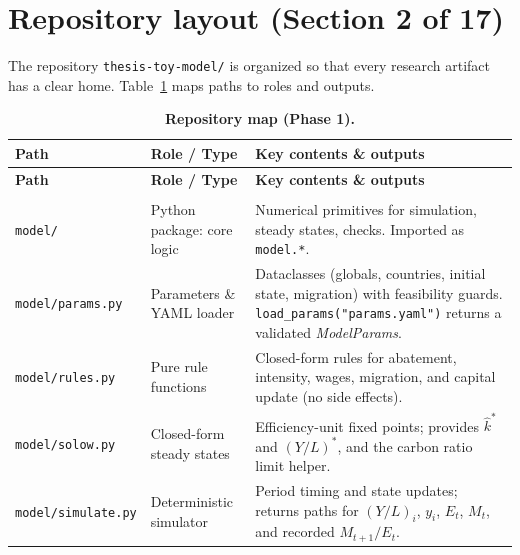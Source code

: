 \documentclass[12pt,a4paper]{article}
\newcommand{\code}[1]{\texttt{#1}}
\begin{document}
\section{Repository layout (Section 2 of 17)}
The repository \code{thesis-toy-model/} is organized so that every research artifact has a clear home. Table~\ref{tab:repo} maps paths to roles and outputs.

\begin{small}
\begin{longtable}{@{} >{\raggedright\arraybackslash}p{}
                         >{\raggedright\arraybackslash}p{}
                         >{\raggedright\arraybackslash}p{} @{}}
\caption{\textbf{Repository map (Phase 1).}} \label{tab:repo}\\
\toprule
\textbf{Path} & \textbf{Role / Type} & \textbf{Key contents \& outputs}\\
\midrule
\endfirsthead
\toprule
\textbf{Path} & \textbf{Role / Type} & \textbf{Key contents \& outputs}\\
\midrule
\endhead
\midrule
\multicolumn{3}{r}{\emph{continued on next page}}\\
\bottomrule
\endfoot
\bottomrule
\endlastfoot

\nolinkurl{model/} &
Python package: core logic &
Numerical primitives for simulation, steady states, checks. Imported as \nolinkurl{model.*}. \\[2pt]

\nolinkurl{model/params.py} &
Parameters \& YAML loader &
Dataclasses (globals, countries, initial state, migration) with feasibility guards. \nolinkurl{load_params("params.yaml")} returns a validated \emph{ModelParams}. \\[2pt]

\nolinkurl{model/rules.py} &
Pure rule functions &
Closed-form rules for abatement, intensity, wages, migration, and capital update (no side effects). \\[2pt]

\nolinkurl{model/solow.py} &
Closed-form steady states &
Efficiency-unit fixed points; provides \(\hat{k}^\ast\) and \((Y/L)^\ast\), and the carbon ratio limit helper. \\[2pt]

\nolinkurl{model/simulate.py} &
Deterministic simulator &
Period timing and state updates; returns paths for \((Y/L)_i\), \(y_i\), \(E_t\), \(M_t\), and recorded \(M_{t+1}/E_t\). \\[2pt]


\end{longtable}
\end{small}
\end{document}
